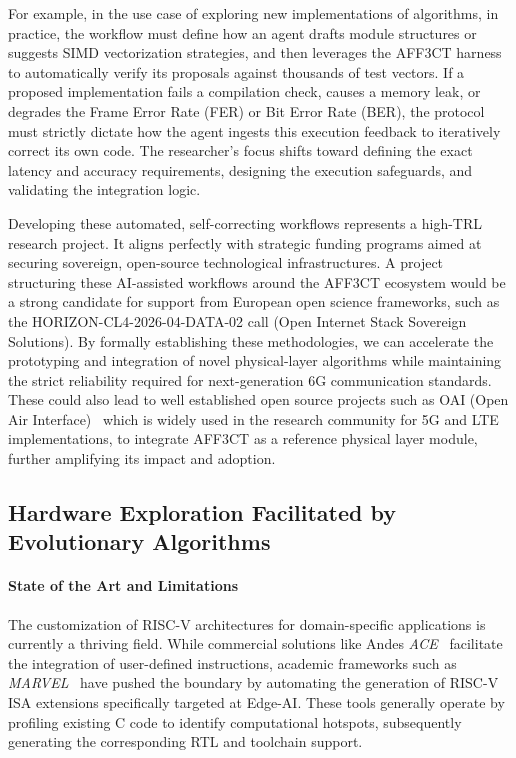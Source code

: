 \documentclass[11pt]{report}
\begin{document}
For example, in the use case of exploring new implementations of algorithms, in practice, the workflow must define how an agent drafts module structures or suggests SIMD vectorization strategies, and then leverages the AFF3CT harness to automatically verify its proposals against thousands of test vectors. If a proposed implementation fails a compilation check, causes a memory leak, or degrades the Frame Error Rate (FER) or Bit Error Rate (BER), the protocol must strictly dictate how the agent ingests this execution feedback to iteratively correct its own code. The researcher's focus shifts toward defining the exact latency and accuracy requirements, designing the execution safeguards, and validating the integration logic.

Developing these automated, self-correcting workflows represents a high-TRL research project. It aligns perfectly with strategic funding programs aimed at securing sovereign, open-source technological infrastructures. A project structuring these AI-assisted workflows around the AFF3CT ecosystem would be a strong candidate for support from European open science frameworks, such as the HORIZON-CL4-2026-04-DATA-02 call (Open Internet Stack Sovereign Solutions). By formally establishing these methodologies, we can accelerate the prototyping and integration of novel physical-layer algorithms while maintaining the strict reliability required for next-generation 6G communication standards. These could also lead to well established open source projects such as OAI (Open Air Interface)~\cite{nikaein2014openairinterface} which is widely used in the research community for 5G and LTE implementations, to integrate AFF3CT as a reference physical layer module, further amplifying its impact and adoption.

\subsection{Hardware Exploration Facilitated by Evolutionary Algorithms}

\paragraph{State of the Art and Limitations}
The customization of RISC-V architectures for domain-specific applications is currently a thriving field. While commercial solutions like Andes \textit{ACE}~\cite{AndesACE} facilitate the integration of user-defined instructions, academic frameworks such as \textit{MARVEL}~\cite{kumar2025marvel} have pushed the boundary by automating the generation of RISC-V ISA extensions specifically targeted at Edge-AI. These tools generally operate by profiling existing C code to identify computational hotspots, subsequently generating the corresponding RTL and toolchain support.
\end{document}
